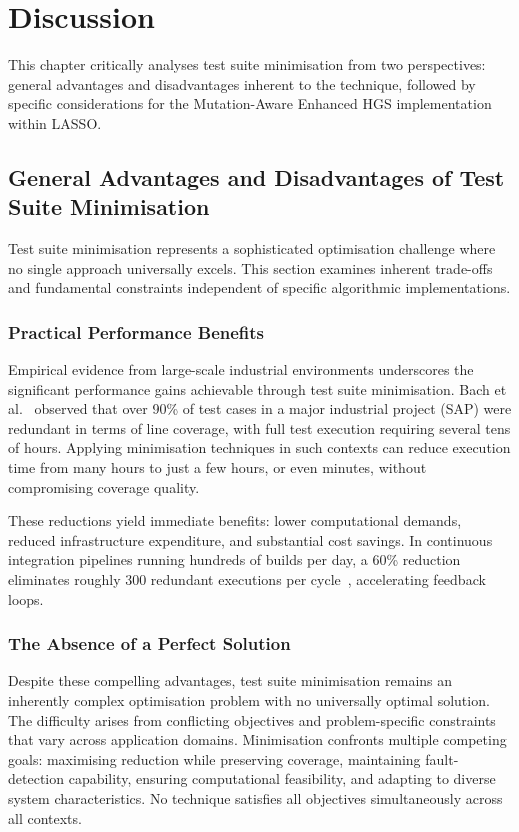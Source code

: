 \chapter{Discussion}
\label{chap:discussion}

This chapter critically analyses test suite minimisation from two perspectives: general advantages and disadvantages inherent to the technique, followed by specific considerations for the Mutation-Aware Enhanced HGS implementation within LASSO.

\section{General Advantages and Disadvantages of Test Suite Minimisation}
\label{sec:discussion:general}

Test suite minimisation represents a sophisticated optimisation challenge where no single approach universally excels. This section examines inherent trade-offs and fundamental constraints independent of specific algorithmic implementations.

\subsection{Practical Performance Benefits}

Empirical evidence from large-scale industrial environments underscores the significant performance gains achievable through test suite minimisation. Bach et al.~\cite{bach2017} observed that over 90\% of test cases in a major industrial project (SAP) were redundant in terms of line coverage, with full test execution requiring several tens of hours. Applying minimisation techniques in such contexts can reduce execution time from many hours to just a few hours, or even minutes, without compromising coverage quality.

These reductions yield immediate benefits: lower computational demands, reduced infrastructure expenditure, and substantial cost savings. In continuous integration pipelines running hundreds of builds per day, a 60\% reduction eliminates roughly 300 redundant executions per cycle~\cite{yoo2012}, accelerating feedback loops.


\subsection{The Absence of a Perfect Solution}

Despite these compelling advantages, test suite minimisation remains an inherently complex optimisation problem with no universally optimal solution. The difficulty arises from conflicting objectives and problem-specific constraints that vary across application domains. Minimisation confronts multiple competing goals: maximising reduction while preserving coverage, maintaining fault-detection capability, ensuring computational feasibility, and adapting to diverse system characteristics. No technique satisfies all objectives simultaneously across all contexts.

